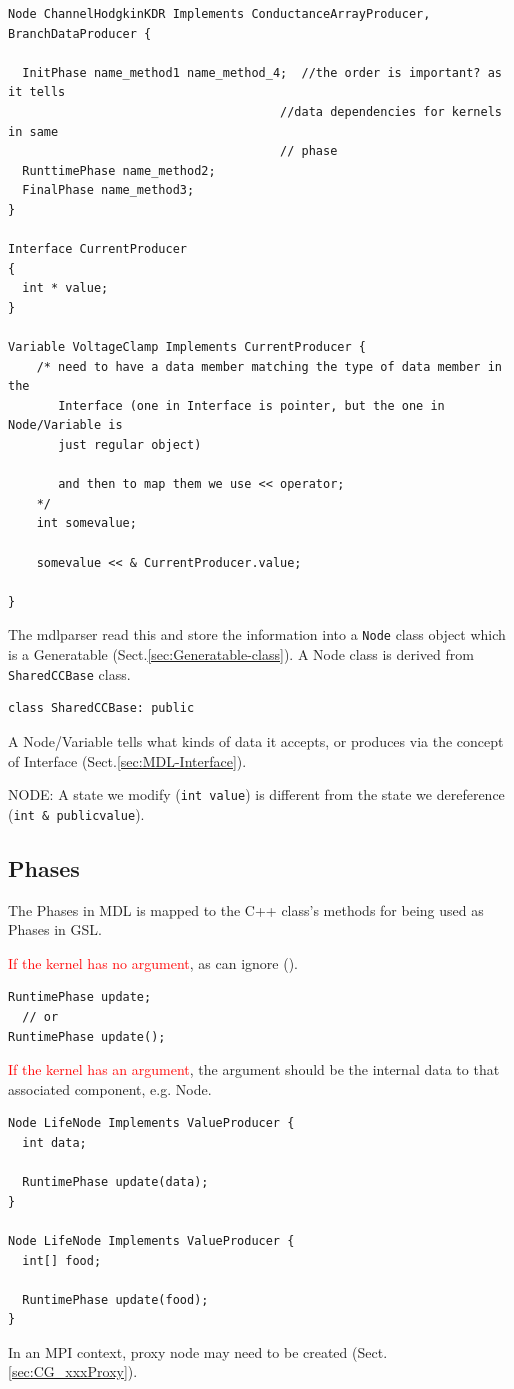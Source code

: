\begin{verbatim}
Node ChannelHodgkinKDR Implements ConductanceArrayProducer, BranchDataProducer {

  InitPhase name_method1 name_method_4;  //the order is important? as it tells
                                      //data dependencies for kernels in same
                                      // phase
  RunttimePhase name_method2;
  FinalPhase name_method3;
}

Interface CurrentProducer
{
  int * value;
}

Variable VoltageClamp Implements CurrentProducer {
    /* need to have a data member matching the type of data member in the
       Interface (one in Interface is pointer, but the one in Node/Variable is
       just regular object)
       
       and then to map them we use << operator;
    */
    int somevalue;
    
    somevalue << & CurrentProducer.value;
    
}
\end{verbatim}


The mdlparser read this and store the information into a \verb!Node! class
object which is a Generatable (Sect.\ref{sec:Generatable-class}). A Node class
is derived from \verb!SharedCCBase! class.

\begin{lstlisting}
class SharedCCBase: public 
\end{lstlisting}


A Node/Variable tells what kinds of data it accepts, or produces via the concept
of Interface (Sect.\ref{sec:MDL-Interface}).

NODE: A state we modify (\verb!int value!) is different from the state we
dereference (\verb!int & publicvalue!).

\subsection{Phases}
\label{sec:Phases-MDL}

The Phases in MDL is mapped to the C++ class's methods for being used as
Phases in GSL.

\textcolor{red}{If the kernel has no argument}, as can ignore ().
\begin{verbatim}
RuntimePhase update;
  // or
RuntimePhase update();
\end{verbatim}

\textcolor{red}{If the kernel has an argument}, the argument should be the
internal data to that associated component, e.g. Node. 
\begin{verbatim}
Node LifeNode Implements ValueProducer {
  int data;
  
  RuntimePhase update(data);
}

Node LifeNode Implements ValueProducer {
  int[] food;
  
  RuntimePhase update(food);
}
\end{verbatim}
In an MPI context, proxy node may need to be created
(Sect.\ref{sec:CG_xxxProxy}).

